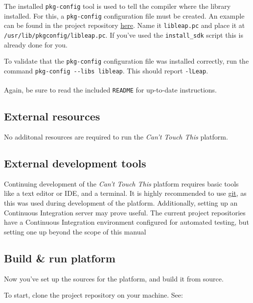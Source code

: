 \documentclass{standalone}
\begin{document}
  The installed \verb_pkg-config_ tool is used to tell the compiler where the
  library installed. For this, a \verb_pkg-config_ configuration file must be
  created. An example can be found in the project repository
  \href{https://gitlab.com/timvisee/cant-touch-this/blob/ece65fab15b3c088e57628dc0c82474efddbbfd2/ci/libleap.pc}{here}.
  Name it \verb_libleap.pc_ and place it at
  \verb_/usr/lib/pkgconfig/libleap.pc_. If you've used the \verb`install_sdk`
  script this is already done for you.

  To validate that the \verb_pkg-config_ configuration file was installed
  correctly, run the command \verb_pkg-config --libs libleap_. This should
  report \verb_-lLeap_.

  \paragraph{}
  Again, be sure to read the included \verb_README_ for up-to-date instructions.

  \subsection{External resources}
  No additonal resources are required to run the \textit{Can't Touch This}
  platform.

  \subsection{External development tools}
  Continuing development of the \textit{Can't Touch This} platform requires
  basic tools like a text editor or IDE, and a terminal. It is highly
  recommended to use \href{https://git-scm.com/}{git}, as this was used during
  development of the platform. Additionally, setting up an Continuous Integration server may prove
  useful. The current project repositories have a Continuous Integration
  environment configured for automated testing, but setting one up beyond the
  scope of this manual 

  \subsection{Build \& run platform}
  Now you've set up the sources for the platform, and build it from source.

  To start, clone the project repository on your machine. See:
  
\end{document}
